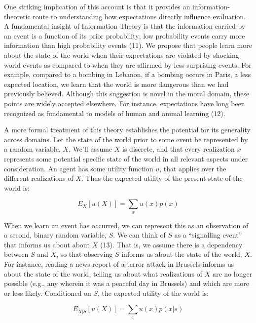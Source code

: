 \documentclass[9pt,twocolumn,twoside,]{pnas-new}
\begin{document}
One striking implication of this account is that it provides an
information-theoretic route to understanding how expectations directly
influence evaluation. A fundamental insight of Information Theory is
that the information carried by an event is a function of its prior
probability; low probability events carry more information than high
probability events (11). We propose that people learn more about the
state of the world when their expectations are violated by shocking
world events as compared to when they are affirmed by less surprising
events. For example, compared to a bombing in Lebanon, if a bombing
occurs in Paris, a less expected location, we learn that the world is
more dangerous than we had previously believed. Although this suggestion
is novel in the moral domain, these points are widely accepted
elsewhere. For instance, expectations have long been recognized as
fundamental to models of human and animal learning (12).

A more formal treatment of this theory establishes the potential for its
generality across domains. Let the state of the world prior to some
event be represented by a random variable, \(X\). We'll assume \(X\) is
discrete, and that every realization \(x\) represents some potential
specific state of the world in all relevant aspects under consideration.
An agent has some utility function \(u\), that applies over the
different realizations of \(X\). Thus the expected utility of the
present state of the world is:

\begin{equation*}
E_X[u(X)] = \sum_x u(x)p(x)
\end{equation*}

When we learn an event has occurred, we can represent this as an
observation of a second, binary random variable, \(S\). We can think of
\(S\) as a ``signalling event'' that informs us about about \(X\) (13).
That is, we assume there is a dependency between \(S\) and \(X\), so
that observing \(S\) informs us about the state of the world, \(X\). For
instance, reading a news report of a terror attack in Brussels informs
us about the state of the world, telling us about what realizations of
\(X\) are no longer possible (e.g., any wherein it was a peaceful day in
Brussels) and which are more or less likely. Conditioned on \(S\), the
expected utility of the world is:

\begin{equation*}
E_{X|S}[u(X)] = \sum_x u(x)p(x|s)
\end{equation*}
\end{document}
